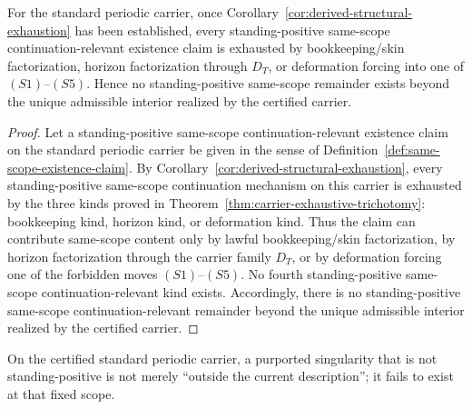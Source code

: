 \begin{manualproposition}
\label{prop:same-scope-existence-coincides}
For the standard periodic carrier, once Corollary~\ref{cor:derived-structural-exhaustion} has been
established, every standing-positive same-scope continuation-relevant existence claim is exhausted by
bookkeeping/skin factorization, horizon factorization through $D_T$, or deformation forcing into
one of $(S1)$--$(S5)$. Hence no standing-positive same-scope remainder exists beyond the unique admissible interior realized by the
certified carrier.
\end{manualproposition}

\begin{proof}
Let a standing-positive same-scope continuation-relevant existence claim on the standard periodic carrier be given in
the sense of Definition~\ref{def:same-scope-existence-claim}. By
Corollary~\ref{cor:derived-structural-exhaustion}, every standing-positive same-scope continuation mechanism on this
carrier is exhausted by the three kinds proved in
Theorem~\ref{thm:carrier-exhaustive-trichotomy}: bookkeeping kind, horizon kind, or deformation
kind. Thus the claim can contribute same-scope content only by lawful bookkeeping/skin
factorization, by horizon factorization through the carrier family $D_T$, or by deformation forcing
one of the forbidden moves $(S1)$--$(S5)$. No fourth standing-positive same-scope continuation-relevant kind exists.
Accordingly, there is no standing-positive same-scope continuation-relevant remainder beyond the unique admissible interior
realized by the certified carrier.
\end{proof}

\begin{manualcorollary}
\label{cor:failure-standing-failure-existence}
On the certified standard periodic carrier, a purported singularity that is not standing-positive is
not merely ``outside the current description''; it fails to exist at that fixed scope.
\end{manualcorollary}

